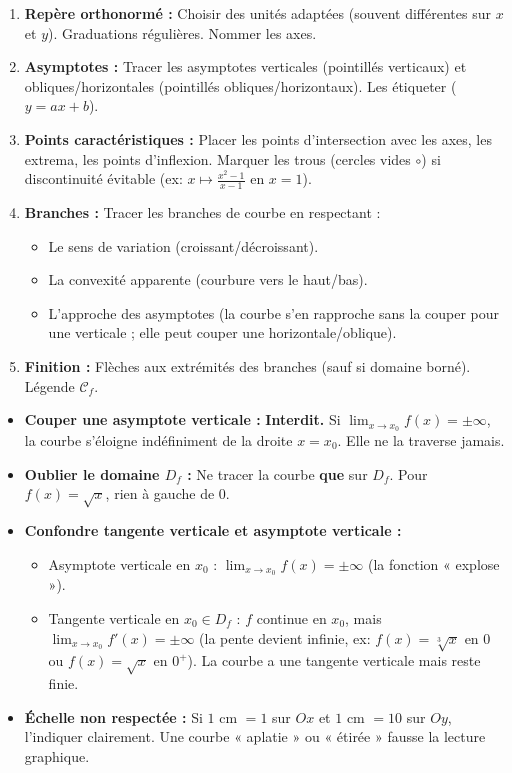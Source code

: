 \documentclass[11pt]{article}
\begin{document}
\begin{methode}
\begin{enumerate}
    \item \textbf{Repère orthonormé :} Choisir des unités adaptées (souvent différentes sur $x$ et $y$). Graduations régulières. Nommer les axes.
    \item \textbf{Asymptotes :} Tracer les asymptotes verticales (pointillés verticaux) et obliques/horizontales (pointillés obliques/horizontaux). Les étiqueter ($y=ax+b$).
    \item \textbf{Points caractéristiques :} Placer les points d'intersection avec les axes, les extrema, les points d'inflexion. Marquer les trous (cercles vides $\circ$) si discontinuité évitable (ex: $x \mapsto \frac{x^2-1}{x-1}$ en $x=1$).
    \item \textbf{Branches :} Tracer les branches de courbe en respectant :
    \begin{itemize}
        \item Le sens de variation (croissant/décroissant).
        \item La convexité apparente (courbure vers le haut/bas).
        \item L'approche des asymptotes (la courbe s'en rapproche sans la couper pour une verticale ; elle peut couper une horizontale/oblique).
    \end{itemize}
    \item \textbf{Finition :} Flèches aux extrémités des branches (sauf si domaine borné). Légende $\mathcal{C}_f$.
\end{enumerate}
\end{methode}

\begin{attention}
\begin{itemize}
    \item \textbf{Couper une asymptote verticale :} \textbf{Interdit.} Si $\lim_{x \to x_0} f(x) = \pm\infty$, la courbe s'éloigne indéfiniment de la droite $x=x_0$. Elle ne la traverse jamais.
    \item \textbf{Oublier le domaine $D_f$ :} Ne tracer la courbe \textbf{que} sur $D_f$. Pour $f(x)=\sqrt{x}$, rien à gauche de $0$.
    \item \textbf{Confondre tangente verticale et asymptote verticale :}
    \begin{itemize}
        \item Asymptote verticale en $x_0$ : $\lim_{x \to x_0} f(x) = \pm\infty$ (la fonction « explose »).
        \item Tangente verticale en $x_0 \in D_f$ : $f$ continue en $x_0$, mais $\lim_{x \to x_0} f'(x) = \pm\infty$ (la pente devient infinie, ex: $f(x)=\sqrt[3]{x}$ en $0$ ou $f(x)=\sqrt{x}$ en $0^+$). La courbe a une tangente verticale mais reste finie.
    \end{itemize}
    \item \textbf{Échelle non respectée :} Si $1$ cm $= 1$ sur $Ox$ et $1$ cm $= 10$ sur $Oy$, l'indiquer clairement. Une courbe « aplatie » ou « étirée » fausse la lecture graphique.
\end{itemize}
\end{attention}
\end{document}
